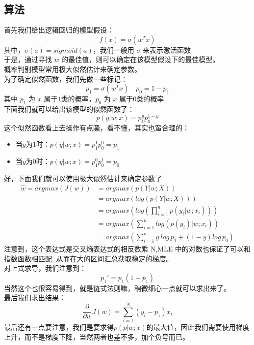 \documentclass{report}
\begin{document}
\subsection{算法}
首先我们给出逻辑回归的模型假设：
$$
f(x)=\sigma(w^Tx)
$$
其中，$\sigma(a)=sigmoid(a)$，我们一般用 $\sigma$ 来表示激活函数\\
于是，通过寻找 $w$ 的最佳值，则可以确定在该模型假设下的最佳模型。\\
概率判别模型常用极大似然估计来确定参数。\\
为了确定似然函数，我们先做一些标记：
$$
p_1=\sigma(w^Tx) \quad p_0=1-p_1
$$
其中 $p_1$ 为 $x$ 属于$1$类的概率，$p_0$ 为 $x$ 属于$0$类的概率\\
下面我们就可以给出该模型的似然函数了：
$$
p(y|w;x)=p_1^yp_0^{1-y}
$$
这个似然函数看上去操作有点骚，看不懂，其实也蛮合理的：
\begin{itemize}
	\item 当$y$为$1$时：$p(y|w;x)=p_1^1p_0^0=p_1$
	\item 当$y$为$0$时：$p(y|w;x)=p_1^0p_0^1=p_0$
\end{itemize}
好，下面我们就可以使用极大似然估计来确定参数了
\begin{equation}
\begin{aligned}
\hat{w}=argmax(J(w))&=argmax(p(Y|w;X))\\
&=argmax(log(p(Y|w;X)))\\
&=argmax(log(\prod_{i=1}^n p(y_i|w;x_i)))\\
&=argmax(\sum_{i=1}^n log(p(y_i)|w;x_i))\\
&=argmax(\sum_{i=1}^n y\ log\, p_1+(1-y)log\,p_0)
\end{aligned}
\end{equation}
注意到，这个表达式是交叉熵表达式的相反数乘 N,MLE 中的对数也保证了可以和指数函数相匹配, 从而在大的区间汇总获取稳定的梯度。\\
对上式求导，我们注意到：
$$
p_1'=p_1(1-p_1)
$$
当然这个也很容易得到，就是链式法则嘛，稍微细心一点就可以求出来了。\\
最后我们求出结果：
$$
\frac{\partial}{\partial w}J(w)=\sum_{i=1}^{N}\left(y_{i}-p_{1}\right) x_{i}
$$
最后还有一点要注意，我们是要求得$p(p|w;x)$的最大值，因此我们需要使用梯度上升，而不是梯度下降，当然两者也差不多，加个负号而已。
\end{document}

